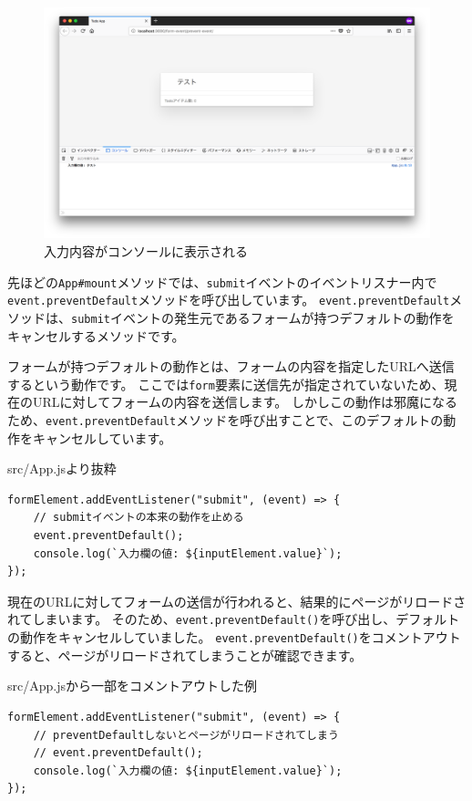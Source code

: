 \begin{figure}
\centering
\includegraphics[width=120mm]{./fig/form-event.png}
\caption{入力内容がコンソールに表示される}
\end{figure}

先ほどの\texttt{App\#mount}メソッドでは、\texttt{submit}イベントのイベントリスナー内で\texttt{event.preventDefault}メソッドを呼び出しています。
\texttt{event.preventDefault}メソッドは、\texttt{submit}イベントの発生元であるフォームが持つデフォルトの動作をキャンセルするメソッドです。

フォームが持つデフォルトの動作とは、フォームの内容を指定したURLへ送信するという動作です。
ここでは\texttt{form}要素に送信先が指定されていないため、現在のURLに対してフォームの内容を送信します。
しかしこの動作は邪魔になるため、\texttt{event.preventDefault}メソッドを呼び出すことで、このデフォルトの動作をキャンセルしています。

\begin{listtitle}
src/App.jsより抜粋
\end{listtitle}
\begin{lstlisting}
formElement.addEventListener("submit", (event) => {
    // submitイベントの本来の動作を止める
    event.preventDefault();
    console.log(`入力欄の値: ${inputElement.value}`);
});
\end{lstlisting}
\listend

現在のURLに対してフォームの送信が行われると、結果的にページがリロードされてしまいます。
そのため、\texttt{event.preventDefault()}を呼び出し、デフォルトの動作をキャンセルしていました。
\texttt{event.preventDefault()}をコメントアウトすると、ページがリロードされてしまうことが確認できます。

\begin{listtitle}
src/App.jsから一部をコメントアウトした例
\end{listtitle}
\begin{lstlisting}
formElement.addEventListener("submit", (event) => {
    // preventDefaultしないとページがリロードされてしまう
    // event.preventDefault();
    console.log(`入力欄の値: ${inputElement.value}`);
});
\end{lstlisting}
\listend

